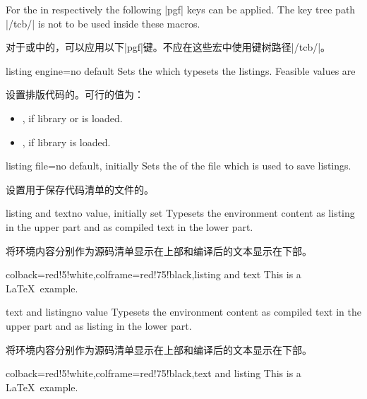 For the  in  respectively 
the following |pgf| keys can be applied. The key tree path |/tcb/| is not to
be used inside these macros.

对于或中的，可以应用以下|pgf|键。不应在这些宏中使用键树路径|/tcb/|。
\begin{docTcbKey}{listing engine}{=}{no default}
Sets the  which typesets the listings. Feasible values are

设置排版代码的。可行的值为： %
\begin{itemize}
\item{}, if library  or
 is loaded.
\item{}, if library  is loaded.
\end{itemize}
\end{docTcbKey}

\begin{docTcbKey}{listing file}{=}{no default, initially }
Sets the  of the file which is used to save listings.

设置用于保存代码清单的文件的。
\end{docTcbKey}


\begin{docTcbKey}{listing and text}{}{no value, initially set}
Typesets the environment content as listing in the upper part and
as compiled text in the lower part.

将环境内容分别作为源码清单显示在上部和编译后的文本显示在下部。
\begin{dispExample}
\begin{tcblisting}{colback=red!5!white,colframe=red!75!black,listing and text}
This is a \LaTeX\ example.
\end{tcblisting}
\end{dispExample}
\end{docTcbKey}


\begin{docTcbKey}{text and listing}{}{no value}
Typesets the environment content as compiled text in the upper part and
as listing in the lower part.

将环境内容分别作为源码清单显示在上部和编译后的文本显示在下部。
\begin{dispExample}
\begin{tcblisting}{colback=red!5!white,colframe=red!75!black,text and listing}
This is a \LaTeX\ example.
\end{tcblisting}
\end{dispExample}
\end{docTcbKey}


